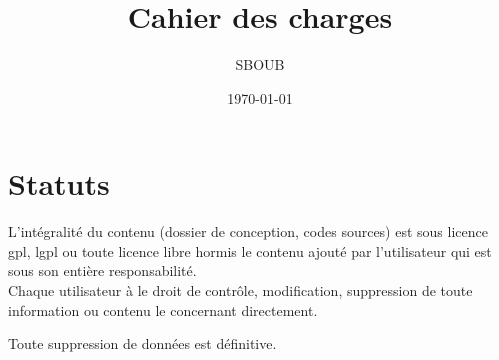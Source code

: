 \documentclass[11pt]{report}
\title{\textbf{Cahier des charges}}
\author{SBOUB}
\date{\today}
\begin{document}
\maketitle

\tableofcontents

\chapter{Statuts}

L'intégralité du contenu (dossier de conception, codes sources) est sous licence gpl, lgpl ou toute licence libre hormis le contenu ajouté par l'utilisateur qui est sous son entière responsabilité.\\
Chaque utilisateur à le droit de contrôle, modification, suppression de toute information ou contenu le concernant directement.

Toute suppression de données est définitive.










\end{document}
